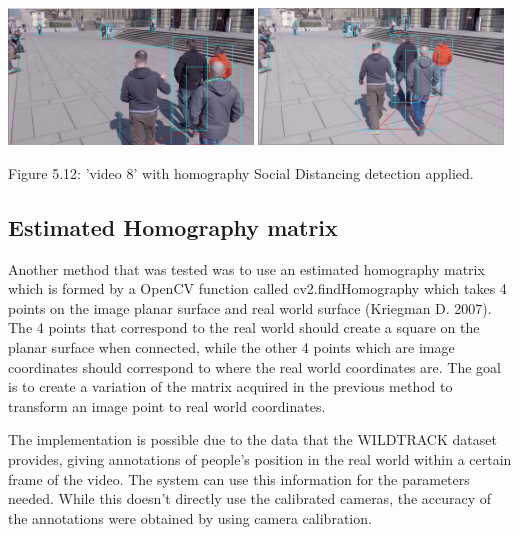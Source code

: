 \documentclass[12pt]{report}
\begin{document}
\begin{center}
	\includegraphics[width=65mm]{./images/appendix/HomographyExample1.JPG}
	\includegraphics[width=65mm]{./images/appendix/HomographyExample2.JPG}
	
	{\footnotesize Figure 5.12: 'video 8' with homography Social Distancing detection applied.}
\end{center}

\subsection*{Estimated Homography matrix}

Another method that was tested was to use an estimated homography matrix which is formed by a OpenCV function called cv2.findHomography which takes 4 points on the image planar surface and real world surface (Kriegman D. 2007). The 4 points that correspond to the real world should create a square on the planar surface when connected, while the other 4 points which are image coordinates should correspond to where the real world coordinates are. The goal is to create a variation of the matrix acquired in the previous method to transform an image point to real world coordinates.


\vspace{2mm}

The implementation is possible due to the data that the WILDTRACK dataset provides, giving annotations of people's position in the real world within a certain frame of the video. The system can use this information for the parameters needed. While this doesn't directly use the calibrated cameras, the accuracy of the annotations were obtained by using camera calibration.

\vspace{2mm}
\end{document}
